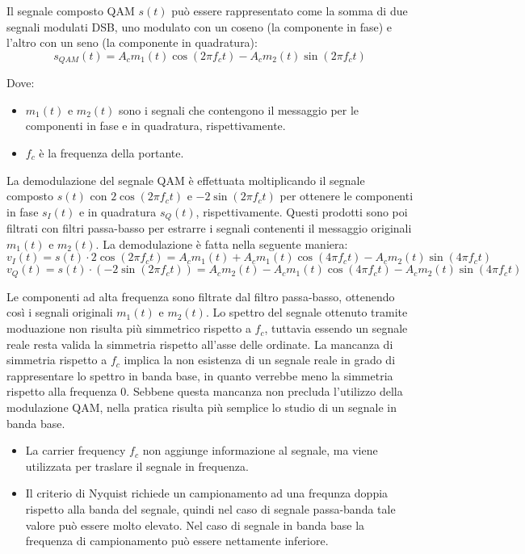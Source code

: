 Il segnale composto QAM \( s(t) \) può essere rappresentato come la somma di due segnali modulati DSB, uno modulato con un coseno (la componente in fase) e l'altro con un seno (la componente in quadratura):
\begin{equation}
    s_{QAM}(t) = A_{c} m_1(t) \cos(2\pi f_c t) - A_{c} m_2(t) \sin(2\pi f_c t)
\end{equation}

Dove:
\begin{itemize}
    \item \( m_1(t) \) e \( m_2(t) \) sono i segnali che contengono il messaggio per le componenti in fase e in quadratura, rispettivamente.
    \item \( f_c \) è la frequenza della portante.
\end{itemize}


La demodulazione del segnale QAM è effettuata moltiplicando il segnale composto \( s(t) \) con \( 2\cos(2\pi f_c t) \) e \( -2\sin(2\pi f_c t) \) per ottenere le componenti in fase \( s_I(t) \) e in quadratura \( s_Q(t) \), rispettivamente.
Questi prodotti sono poi filtrati con filtri passa-basso per estrarre i segnali contenenti il messaggio originali \( m_1(t) \) e \( m_2(t) \).
La demodulazione è fatta nella seguente maniera:
\begin{equation}
    v_I(t) = s(t) \cdot 2\cos(2\pi f_c t) = A_{c} m_1(t) + A_{c} m_1(t) \cos(4\pi f_c t) - A_{c} m_2(t) \sin(4\pi f_c t)
\end{equation}
\begin{equation}
    v_Q(t) = s(t) \cdot (-2\sin(2\pi f_c t)) = A_{c} m_2(t) - A_{c} m_1(t) \cos(4\pi f_c t) - A_{c} m_2(t) \sin(4\pi f_c t)
\end{equation}

Le componenti ad alta frequenza sono filtrate dal filtro passa-basso, ottenendo così i segnali originali \( m_1(t) \) e \( m_2(t) \).
Lo spettro del segnale ottenuto tramite moduazione non risulta più simmetrico rispetto a $f_c$, tuttavia essendo un segnale reale resta valida la simmetria rispetto all'asse delle ordinate.
La mancanza di simmetria rispetto a $f_c$ implica la non esistenza di un segnale reale in grado di rappresentare lo spettro in banda base, in quanto verrebbe meno la simmetria rispetto alla frequenza 0.
Sebbene questa mancanza non precluda l'utilizzo della modulazione QAM, nella pratica risulta più semplice lo studio di un segnale in banda base.
\begin{itemize}
    \item La carrier frequency \( f_c \) non aggiunge informazione al segnale, ma viene utilizzata per traslare il segnale in frequenza.
    \item Il criterio di Nyquist richiede un campionamento ad una frequnza doppia rispetto alla banda del segnale, quindi nel caso di segnale passa-banda tale valore può essere molto elevato. Nel caso di segnale in banda base la frequenza di campionamento può essere nettamente inferiore.
\end{itemize}

